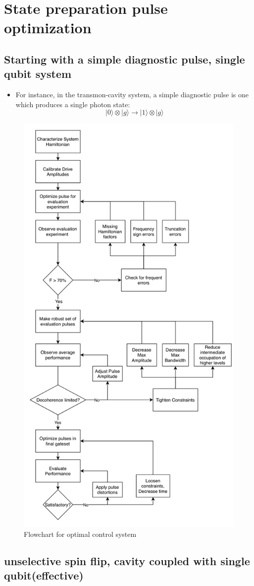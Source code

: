\documentclass{article}
\begin{document}
\section{State preparation pulse optimization}
\subsection{Starting with a simple diagnostic pulse, single qubit system}
\begin{itemize}
    \item For instance, in the transmon-cavity system, a simple diagnostic pulse is one which produces a single photon state:
        $$|0\rangle \otimes|g\rangle \longrightarrow|1\rangle \otimes|g\rangle$$
\end{itemize}

\begin{figure}[H]
    \centering
    \includegraphics[width=0.6\linewidth]{flowchart.png}
    \caption{Flowchart for optimal control system}
    \label{fig:flowchart}
\end{figure}

\subsection{unselective spin flip, cavity coupled with single qubit(effective)}
\end{document}
